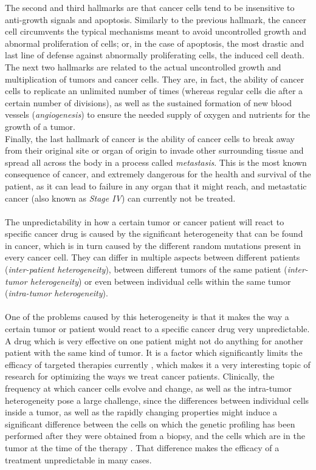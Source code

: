 The second and third hallmarks are that cancer cells tend to be insensitive to anti-growth signals and apoptosis. Similarly to the previous hallmark, the cancer cell circumvents the typical mechanisms meant to avoid uncontrolled growth and abnormal proliferation of cells; or, in the case of apoptosis, the most drastic and last line of defense against abnormally proliferating cells, the induced cell death.\\
The next two hallmarks are related to the actual uncontrolled growth and multiplication of tumors and cancer cells. They are, in fact, the ability of cancer cells to replicate an unlimited number of times (whereas regular cells die after a certain number of divisions), as well as the sustained formation of new blood vessels (\textit{angiogenesis}) to ensure the needed supply of oxygen and nutrients for the growth of a tumor.\\
Finally, the last hallmark of cancer is the ability of cancer cells to break away from their original site or organ of origin to invade other surrounding tissue and spread all across the body in a process called \textit{metastasis}. This is the most known consequence of cancer, and extremely dangerous for the health and survival of the patient, as it can lead to failure in any organ that it might reach, and metastatic cancer (also known as \textit{Stage IV}) can currently not be treated.\\~\\
The unpredictability \cite{heterogeneity-implications-targeted-therapeutics} in how a certain tumor or cancer patient will react to specific cancer drug is caused by the significant heterogeneity that can be found in cancer, which is in turn caused by the different random mutations present in every cancer cell. They can differ in multiple aspects between different patients (\textit{inter-patient heterogeneity}), between different tumors of the same patient (\textit{inter-tumor heterogeneity}) or even between individual cells within the same tumor (\textit{intra-tumor heterogeneity}). \cite{heterogeneity-implications-targeted-therapeutics}\\~\\
One of the problems caused by this heterogeneity is that it makes the way a certain tumor or patient would react to a specific cancer drug very unpredictable. A drug which is very effective on one patient might not do anything for another patient with the same kind of tumor. It is a factor which significantly limits the efficacy of targeted therapies currently \cite{heterogeneity-is-it-a-problem}, which makes it a very interesting topic of research for optimizing the ways we treat cancer patients. Clinically, the frequency at which cancer cells evolve and change, as well as the intra-tumor heterogeneity pose a large challenge, since the differences between individual cells inside a tumor, as well as the rapidly changing properties might induce a significant difference between the cells on which the genetic profiling has been performed after they were obtained from a biopsy, and the cells which are in the tumor at the time of the therapy \cite{heterogeneity-is-it-a-problem}. That difference makes the efficacy of a treatment unpredictable in many cases.\\~\\
